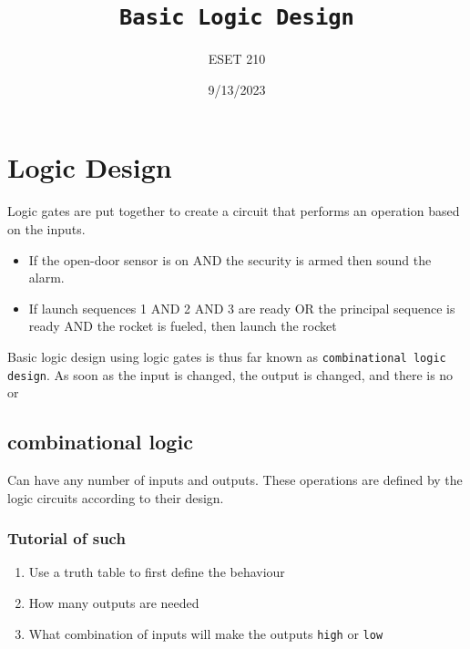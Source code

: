 \documentclass[a4paper,12pt]{article}
\title{\texttt{Basic Logic Design}\\\hrulefill}
\author{ESET 210}
\date{\small{9/13/2023}}
\begin{document}
    \maketitle

    \section{Logic Design}
    Logic gates are put together to create a circuit that performs an operation based on the inputs.
        \begin{itemize}\vspace{3pt}
            \item If the open-door sensor is on AND the security is armed then sound the alarm.
            \item If launch sequences 1 AND 2 AND 3 are ready OR the principal sequence is ready AND the
            rocket is fueled, then launch the rocket
        \end{itemize}
    Basic logic design using logic gates is thus far known as \texttt{combinational logic design}. As soon as the input is changed, the output is changed, and there is no  or 

    \subsection*{combinational logic}
        Can have any number of inputs and outputs. These operations are defined by the logic circuits according to their design.

        \subsubsection*{Tutorial of such}
            \begin{enumerate}
                \item Use a truth table to first define the behaviour
                \item How many outputs are needed
                \item What combination of inputs will make the outputs \texttt{high} or \texttt{low}
            \end{enumerate}
\end{document}
